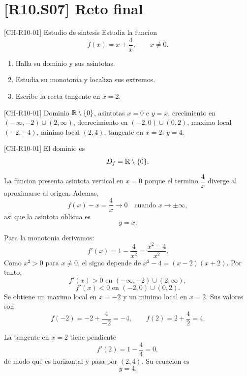 \section{[R10.S07] Reto final}

\begin{challenge}{[CH-R10-01] Estudio de sintesis}
Estudia la funcion
\[
f(x)=x+\frac{4}{x},\qquad x\neq 0.
\]

\begin{enumerate}
  \item Halla su dominio y sus asintotas.
  \item Estudia su monotonia y localiza sus extremos.
  \item Escribe la recta tangente en \(x=2\).
\end{enumerate}
\end{challenge}

\begin{center}
\end{center}

\begin{shortanswer}{[CH-R10-01]}
Dominio \(\mathbb{R}\setminus\{0\}\), asintotas \(x=0\) e \(y=x\), crecimiento en
\((-\infty,-2)\cup(2,\infty)\), decrecimiento en \((-2,0)\cup(0,2)\), maximo local
\((-2,-4)\), minimo local \((2,4)\), tangente en \(x=2\): \(y=4\).
\end{shortanswer}

\begin{fullsolution}{[CH-R10-01]}
El dominio es
\[
D_f=\mathbb{R}\setminus\{0\}.
\]

La funcion presenta asintota vertical en \(x=0\) porque el termino \(\dfrac{4}{x}\) diverge al
aproximarse al origen. Ademas,
\[
f(x)-x=\frac{4}{x}\longrightarrow 0 \quad \text{cuando } x\to \pm \infty,
\]
asi que la asintota oblicua es
\[
y=x.
\]

Para la monotonia derivamos:
\[
f'(x)=1-\frac{4}{x^2}=\frac{x^2-4}{x^2}.
\]
Como \(x^2>0\) para \(x\neq 0\), el signo depende de \(x^2-4=(x-2)(x+2)\). Por tanto,
\[
f'(x)>0 \text{ en }(-\infty,-2)\cup(2,\infty),
\]
\[
f'(x)<0 \text{ en }(-2,0)\cup(0,2).
\]
Se obtiene un maximo local en \(x=-2\) y un minimo local en \(x=2\). Sus valores son
\[
f(-2)=-2+\frac{4}{-2}=-4,\qquad f(2)=2+\frac{4}{2}=4.
\]

La tangente en \(x=2\) tiene pendiente
\[
f'(2)=1-\frac{4}{4}=0,
\]
de modo que es horizontal y pasa por \((2,4)\). Su ecuacion es
\[
y=4.
\]
\end{fullsolution}

